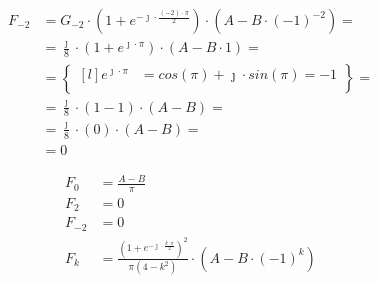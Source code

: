 \begin{task}
\begin{align*}
F_{-2}&= G_{-2} \cdot \left(1+ e^{-\jmath \cdot \frac{(-2) \cdot \pi}{2}}\right) \cdot \left(A - B \cdot (-1)^{-2}\right)=\\
&=\frac{\jmath}{8} \cdot \left(1+ e^{\jmath \cdot \pi}\right) \cdot \left(A - B \cdot 1\right)=\\
&=\begin{Bmatrix*}[l]
e^{\jmath \cdot \pi} &= cos\left(\pi\right) +\jmath \cdot sin\left(\pi\right) = -1\\
\end{Bmatrix*}=\\
&=\frac{\jmath}{8} \cdot \left(1 - 1\right) \cdot \left(A - B\right)=\\
&=\frac{\jmath}{8} \cdot \left(0\right) \cdot \left(A - B\right)=\\
&=0
\end{align*}


\begin{align*}
F_0&=\frac{A - B}{\pi}\\
F_{2}&=0\\
F_{-2}&=0\\
F_k&= \frac{\left(1 + e^{-\jmath \cdot \frac{k \cdot \pi}{2}}\right)^2}{\pi \left(4-k^2\right)} \cdot \left(A - B \cdot (-1)^k\right)
\end{align*}

\end{task}